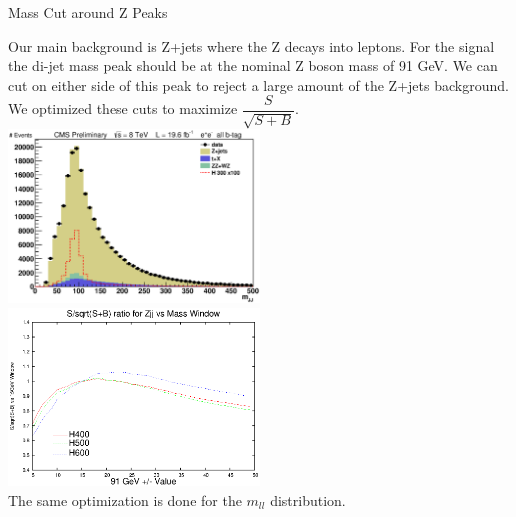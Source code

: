 \begin{frame}{Mass Cut around Z Peaks}
\begin{center}
Our main background is Z+jets where the Z decays into leptons.  For the signal the di-jet mass peak should be at the nominal Z boson mass of 91 GeV.  We can cut on either side of this peak to reject a large amount of the Z+jets background. We optimized these cuts to maximize $\dfrac{S}{\sqrt{S+B}}$.
\\
\includegraphics[width=0.5\textwidth]{images/preselection/el/mJJ.eps}
\includegraphics[width=0.5\textwidth]{images/test_zjj_s_sb_zero.eps}\\
The same optimization is done for the $m_{ll}$ distribution.
\end{center}
\end{frame}

